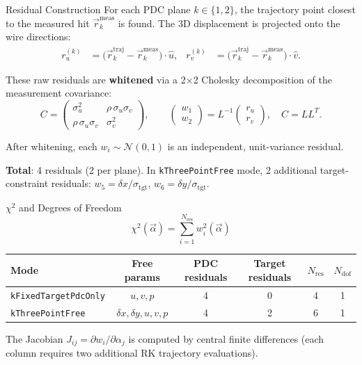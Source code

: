 \documentclass[aspectratio=169]{beamer}
\begin{document}
\begin{frame}{Residual Construction}
\small
For each PDC plane $k \in \{1,2\}$, the trajectory point closest to the measured hit $\vec{r}_k^\mathrm{meas}$ is found. The 3D displacement is projected onto the wire directions:
\begin{align}
r_u^{(k)} &= \bigl(\vec{r}_k^\mathrm{traj} - \vec{r}_k^\mathrm{meas}\bigr) \cdot \hat{u}, &
r_v^{(k)} &= \bigl(\vec{r}_k^\mathrm{traj} - \vec{r}_k^\mathrm{meas}\bigr) \cdot \hat{v}.
\end{align}

These raw residuals are \textbf{whitened} via a 2$\times$2 Cholesky decomposition of the measurement covariance:
\[
C = \begin{pmatrix} \sigma_u^2 & \rho\,\sigma_u\sigma_v \\ \rho\,\sigma_u\sigma_v & \sigma_v^2 \end{pmatrix},
\qquad
\begin{pmatrix} w_1 \\ w_2 \end{pmatrix}
= L^{-1}
\begin{pmatrix} r_u \\ r_v \end{pmatrix},
\quad C = L L^T.
\]

After whitening, each $w_i \sim \mathcal{N}(0, 1)$ is an independent, unit-variance residual.

\vspace{0.1cm}
\textbf{Total}: 4 residuals (2 per plane). In \texttt{kThreePointFree} mode, 2 additional target-constraint residuals: $w_5 = \delta x / \sigma_\mathrm{tgt}$, $w_6 = \delta y / \sigma_\mathrm{tgt}$.
\end{frame}

\begin{frame}{$\chi^2$ and Degrees of Freedom}
\small
\[
\chi^2(\vec{\alpha}) = \sum_{i=1}^{N_\mathrm{res}} w_i^2(\vec{\alpha})
\]

\begin{table}
\centering
\begin{tabular}{lccccc}
\toprule
Mode & Free params & PDC residuals & Target residuals & $N_\mathrm{res}$ & $N_\mathrm{dof}$ \\
\midrule
\texttt{kFixedTargetPdcOnly} & $u, v, p$ & 4 & 0 & 4 & 1 \\
\texttt{kThreePointFree} & $\delta x, \delta y, u, v, p$ & 4 & 2 & 6 & 1 \\
\bottomrule
\end{tabular}
\end{table}

\vspace{0.2cm}
The Jacobian $J_{ij} = \partial w_i / \partial \alpha_j$ is computed by central finite differences (each column requires two additional RK trajectory evaluations).
\end{frame}
\end{document}
